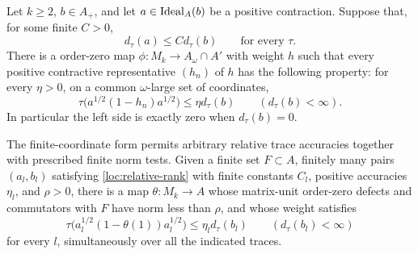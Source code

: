 \begin{proposition}
\label{prop:localized-trace}
Let $k\ge2$, $b\in A_+$, and let $a\in\operatorname{Ideal}_A(b)$ be a positive
contraction.  Suppose that, for some finite $C>0$,
\begin{equation}\label{loc:relative-rank}
 d_\tau(a)\le C d_\tau(b)\qquad\text{for every }\tau.
\end{equation}
There is a \cpc order-zero map $\phi:M_k\to A_\omega\cap A'$ with
weight $h$ such that every positive contractive representative
$(h_n)$ of $h$ has the following property: for every $\eta>0$, on a
common $\omega$-large set of coordinates,
\begin{equation}\label{loc:TL}
 \tau\bigl(a^{1/2}(1-h_n)a^{1/2}\bigr)
       \le\eta d_\tau(b)
 \qquad(d_\tau(b)<\infty).
\end{equation}
In particular the left side is exactly zero when $d_\tau(b)=0$.

The finite-coordinate form permits arbitrary relative trace accuracies
together with prescribed finite norm tests. Given a
finite set $F\subset A$, finitely many pairs $(a_l,b_l)$ satisfying
\eqref{loc:relative-rank} with finite constants $C_l$, positive
accuracies $\eta_l$, and $\rho>0$, there is a \cpc map
$\theta:M_k\to A$ whose matrix-unit order-zero defects and
commutators with $F$ have norm less than $\rho$, and whose weight
satisfies
\begin{equation}\label{loc:TL-coordinate}
 \tau\bigl(a_l^{1/2}(1-\theta(1))a_l^{1/2}\bigr)
     \le\eta_l d_\tau(b_l)
 \qquad(d_\tau(b_l)<\infty)
\end{equation}
for every $l$, simultaneously over all the indicated traces.
\end{proposition}


